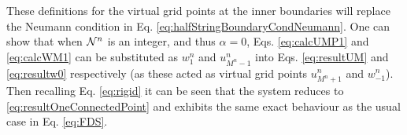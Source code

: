 These definitions for the virtual grid points at the inner boundaries will replace the Neumann condition in Eq. \eqref{eq:halfStringBoundaryCondNeumann}. %
One can show that when $\mathcal{N}^n$ is an integer, and thus $\alpha = 0$, Eqs. \eqref{eq:calcUMP1} and \eqref{eq:calcWM1} can be substituted as $w_1^n$ and $u_{M^n-1}^n$ into Eqs. \eqref{eq:resultUM} and \eqref{eq:resultw0} respectively (as these acted as virtual grid points $u_{M^n+1}^n$ and $w_{-1}^n$). Then recalling Eq. \eqref{eq:rigid} it can be seen that the system reduces to \eqref{eq:resultOneConnectedPoint} and exhibits the same exact behaviour as the usual case in Eq. \eqref{eq:FDS}. %

